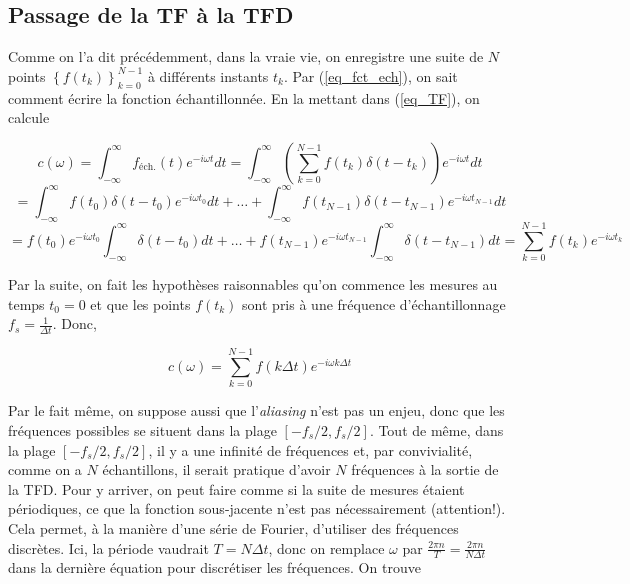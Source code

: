 \subsection{Passage de la TF à la TFD}
Comme on l'a dit précédemment, dans la vraie vie, on enregistre une suite de $N$ points $\left\{f(t_k)\right\}_{k=0}^{N-1}$ à différents instants $t_k$. Par (\ref{eq_fct_ech}), on sait comment écrire la fonction échantillonnée. En la mettant dans (\ref{eq_TF}), on calcule 

\begin{equation*}
    c(\omega) = \int_{-\infty}^{\infty}f_{\text{éch.}}(t)e^{-i\omega t}dt = \int_{-\infty}^{\infty}\left(\sum_{k=0}^{N-1}f(t_k)\delta(t-t_k)\right)e^{-i\omega t}dt 
\end{equation*}
\begin{equation*}
    = \int_{-\infty}^{\infty}f(t_0)\delta(t-t_0)e^{-i\omega t_0}dt + \dots + \int_{-\infty}^{\infty}f(t_{N-1})\delta(t-t_{N-1})e^{-i\omega t_{N-1}}dt 
\end{equation*}
\begin{equation*}
    = f(t_0)e^{-i\omega t_0}\int_{-\infty}^{\infty}\delta(t-t_0)dt + \dots + f(t_{N-1})e^{-i\omega t_{N-1}}\int_{-\infty}^{\infty}\delta(t-t_{N-1})dt = \sum_{k=0}^{N-1}f(t_k)e^{-i\omega t_k}
\end{equation*}

Par la suite, on fait les hypothèses raisonnables qu'on commence les mesures au temps $t_0 = 0$ et que les points $f(t_k)$ sont pris à une fréquence d'échantillonnage $f_s = \frac{1}{\Delta t}$. Donc,

\begin{equation*}
    c(\omega) = \sum_{k=0}^{N-1}f(k\Delta t)e^{-i\omega k\Delta t} 
\end{equation*}

Par le fait même, on suppose aussi que l'\textit{aliasing} n'est pas un enjeu, donc que les fréquences possibles se situent dans la plage $\left[-f_s/2, f_s/2\right]$. Tout de même, dans la plage $\left[-f_s/2, f_s/2\right]$, il y a une infinité de fréquences et, par convivialité, comme on a $N$ échantillons, il serait pratique d'avoir $N$ fréquences à la sortie de la TFD. Pour y arriver, on peut faire comme si la suite de mesures étaient périodiques, ce que la fonction sous-jacente n'est pas nécessairement (attention!). Cela permet, à la manière d'une série de Fourier, d'utiliser des fréquences discrètes. Ici, la période vaudrait $T = N\Delta t$, donc on remplace $\omega$ par $\frac{2\pi n}{T} = \frac{2\pi n}{N\Delta t}$ dans la dernière équation pour discrétiser les fréquences. On trouve 

